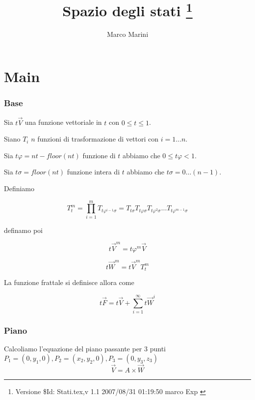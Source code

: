 \documentclass[a4paper,11pt]{article}
\begin{document}
  \title{Spazio degli stati \thanks{Versione \$Id: Stati.tex,v 1.1 2007/08/31 01:19:50 marco Exp $ $}}
  \author{Marco Marini}
  \maketitle
  \part{Main}
  \section{Base}
  
  Sia $ t \vec{V} $ una funzione vettoriale in $ t $ con $ 0 \le t \le 1 $.
  
  Siano $ T_i $ $ n $ funzioni di trasformazione di vettori con $ i = 1 \dots n $.
  
  Sia $ t \varphi = n t - floor(nt) $ funzione di $ t $ abbiamo che $ 0 \le t \varphi < 1 $.
  
  Sia $ t \sigma = floor( n t ) $ funzione intera di $ t $ abbiamo che $ t \sigma = 0 \dots (n - 1) $.
  
  Definiamo
  
  \begin{equation}
    T^m_t = \prod_{i = 1}^{m} T_{t \varphi^{i - 1} \sigma}
    =T_{t \sigma} T_{t \varphi \sigma}T_{t \varphi^2 \sigma}\dots T_{t \varphi^{m - 1} \sigma}
  \end{equation}
  
  definamo poi

  \begin{equation}
    t \vec{V}^m = t \varphi^m \vec V
  \end{equation}

  \begin{equation}
    t \vec{W}^m = t \vec{V}^m T^m_t
  \end{equation}

  La funzione frattale si definisce allora come

  \begin{equation}
    t \vec F = t \vec V + \sum_{i = 1}^\infty t \vec W^i
  \end{equation}

\section{Piano}
Calcoliamo l'equazione del piano passante per 3 punti $ P_1 = (0, y_1, 0), P_2 = (x_2, y_2, 0) , P_3 = (0, y_3, z_3) $
\[
	\vec V = A \times \vec W
\]
\end{document}
